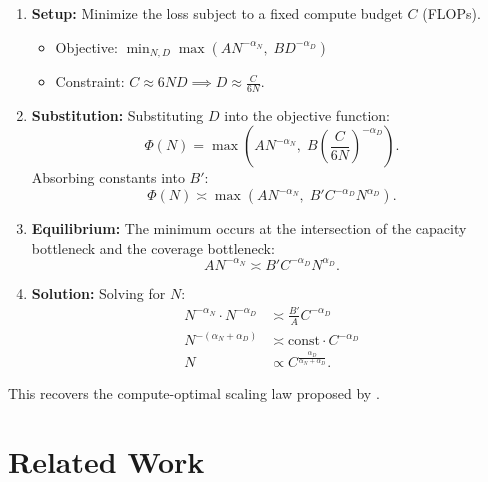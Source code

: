 \documentclass{article}
\theoremstyle{plain}
\theoremstyle{definition}
\theoremstyle{remark}
\begin{document}
\begin{enumerate}
    \item \textbf{Setup:} Minimize the loss subject to a fixed compute budget $C$ (FLOPs).
    \begin{itemize}
        \item Objective: $\min_{N, D} \max\left( A N^{-\alpha_N}, \; B D^{-\alpha_D} \right)$
        \item Constraint: $C \approx 6 N D \implies D \approx \frac{C}{6N}$.
    \end{itemize}

    \item \textbf{Substitution:} Substituting $D$ into the objective function:
    \begin{equation*}
        \Phi(N) = \max\left( A N^{-\alpha_N}, \; B \left( \frac{C}{6N} \right)^{-\alpha_D} \right).
    \end{equation*}
    Absorbing constants into $B'$:
    \begin{equation*}
        \Phi(N) \asymp \max\left( A N^{-\alpha_N}, \; B' C^{-\alpha_D} N^{\alpha_D} \right).
    \end{equation*}

    \item \textbf{Equilibrium:} The minimum occurs at the intersection of the capacity bottleneck and the coverage bottleneck:
    \begin{equation*}
        A N^{-\alpha_N} \asymp B' C^{-\alpha_D} N^{\alpha_D}.
    \end{equation*}

    \item \textbf{Solution:} Solving for $N$:
    \begin{align*}
        N^{-\alpha_N} \cdot N^{-\alpha_D} &\asymp \frac{B'}{A} C^{-\alpha_D} \\
        N^{-(\alpha_N + \alpha_D)} &\asymp \text{const} \cdot C^{-\alpha_D} \\
        N &\propto C^{\frac{\alpha_D}{\alpha_N + \alpha_D}}.
    \end{align*}
\end{enumerate}
This recovers the compute-optimal scaling law proposed by \citet{hoffmann2022trainingcomputeoptimallargelanguage}.

\section{Related Work}
\label{sec:related_work}
\end{document}

